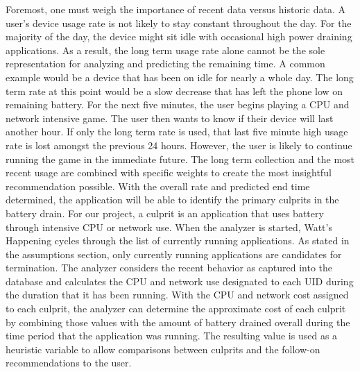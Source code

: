 % 
Foremost, one must weigh the importance of recent data versus historic data.  
A user's device usage rate is not likely to stay constant throughout the day.  
For the majority of the day, the device might sit idle with occasional high power draining applications. 
As a result, the long term usage rate alone cannot be the sole representation for analyzing and predicting the remaining time.  
A common example would be a device that has been on idle for nearly a whole day.  
The long term rate at this point would be a slow decrease that has left the phone low on remaining battery.  
For the next five minutes, the user begins playing a CPU and network intensive game.  
The user then wants to know if their device will last another hour.  
If only the long term rate is used, that last five minute high usage rate is lost amongst the previous 24 hours.  
However, the user is likely to continue running the game in the immediate future.  
The long term collection and the most recent usage are combined with specific weights to create the most insightful recommendation possible. 
With the overall rate and predicted end time determined, the application will be able to identify the primary culprits in the battery drain.  
For our project, a culprit is an application that uses battery through intensive CPU or network use.  
When the analyzer is started, Watt's Happening cycles through the list of currently running applications.  
As stated in the assumptions section, only currently running applications are candidates for termination.  
The analyzer considers the recent behavior as captured into the database and calculates the CPU and network use designated to each UID during the duration that it has been running.  
With the CPU and network cost assigned to each culprit, the analyzer can determine the approximate cost of each culprit by combining those values with the amount of battery drained overall during the time period that the application was running.  
The resulting value is used as a heuristic variable to allow comparisons between culprits and the follow-on recommendations to the user.

